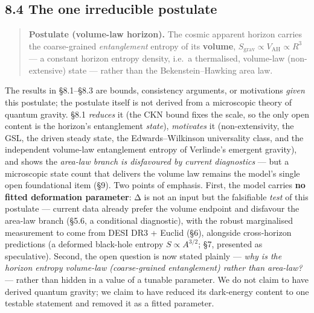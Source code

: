 \documentclass[
  10pt,
]{article}
\begin{document}
\subsection{8.4 The one irreducible
postulate}\label{the-one-irreducible-postulate}

\begin{quote}
\textbf{Postulate (volume-law horizon).} The cosmic apparent horizon
carries the coarse-grained \emph{entanglement} entropy of its
\textbf{volume},
\(S_{\mathrm{grav}} \propto  V_{\mathrm{AH}} \propto  R^{3}\) --- a
constant horizon entropy density, i.e.~a thermalised, volume-law
(non-extensive) state --- rather than the Bekenstein--Hawking area law.
\end{quote}

The results in §8.1--§8.3 are bounds, consistency arguments, or
motivations \emph{given} this postulate; the postulate itself is not
derived from a microscopic theory of quantum gravity. §8.1
\emph{reduces} it (the CKN bound fixes the scale, so the only open
content is the horizon's entanglement \emph{state}), \emph{motivates} it
(non-extensivity, the GSL, the driven steady state, the
Edwards--Wilkinson universality class, and the independent volume-law
entanglement entropy of Verlinde's emergent gravity), and shows the
\emph{area-law branch is disfavoured by current diagnostics} --- but a
microscopic state count that delivers the volume law remains the model's
single open foundational item (§9). Two points of emphasis. First, the
model carries \textbf{no fitted deformation parameter}: Δ is not an
input but the falsifiable \emph{test} of this postulate --- current data
already prefer the volume endpoint and disfavour the area-law branch
(§5.6, a conditional diagnostic), with the robust marginalised
measurement to come from DESI DR3 + Euclid (§6), alongside cross-horizon
predictions (a deformed black-hole entropy \(S \propto  A^{3/2}\); §7,
presented as speculative). Second, the open question is now stated
plainly --- \emph{why is the horizon entropy volume-law (coarse-grained
entanglement) rather than area-law?} --- rather than hidden in a value
of a tunable parameter. We do not claim to have derived quantum gravity;
we claim to have reduced its dark-energy content to one testable
statement and removed it as a fitted parameter.
\end{document}
